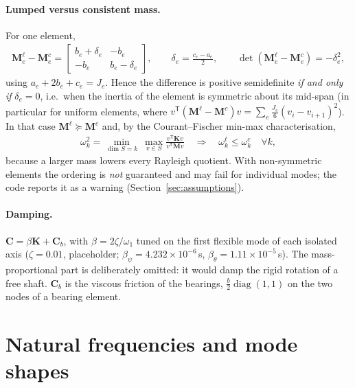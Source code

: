 \documentclass[10pt,a4paper]{article}
\numberwithin{equation}{section}
\begin{document}
\paragraph{Lumped versus consistent mass.} For one element,
\begin{gather}
\mathbf M_e^{\ell} - \mathbf M_e^{c} = \begin{bmatrix} b_e + \delta_e & -b_e \\ -b_e & b_e - \delta_e\end{bmatrix}, \qquad \delta_e = \frac{c_e - a_e}{2}, \qquad
\det\left(\mathbf M_e^{\ell} - \mathbf M_e^{c}\right) = -\delta_e^2 ,
\end{gather}
using $a_e + 2b_e + c_e = J_e$. Hence the difference is positive semidefinite \emph{if and only if} $\delta_e = 0$, i.e.\ when the inertia of the element is symmetric about its mid-span (in particular for uniform elements, where $v^{\mathsf T}(\mathbf M^{\ell}-\mathbf M^{c})v = \sum_e \frac{J_e}{6}(v_i - v_{i+1})^2$). In that case $\mathbf M^{\ell}\succeq\mathbf M^{c}$ and, by the Courant--Fischer min-max characterisation,
\begin{gather}
\omega_k^2 = \min_{\dim S = k}\ \max_{v\in S}\frac{v^{\mathsf T}\mathbf K v}{v^{\mathsf T}\mathbf M v}\quad\Longrightarrow\quad \omega_k^{\ell} \le \omega_k^{c}\quad\forall k,
\end{gather}
because a larger mass lowers every Rayleigh quotient. With non-symmetric elements the ordering is \emph{not} guaranteed and may fail for individual modes; the code reports it as a warning (Section~\ref{sec:assumptions}).
\paragraph{Damping.} $\mathbf C = \beta\mathbf K + \mathbf C_b$, with $\beta = 2\zeta/\omega_1$ tuned on the first flexible mode of each isolated axis ($\zeta = 0.01$, placeholder; $\beta_\psi = 4.232\times10^{-6}$\,s, $\beta_\theta = 1.11\times10^{-5}$\,s). The mass-proportional part is deliberately omitted: it would damp the rigid rotation of a free shaft. $\mathbf C_b$ is the viscous friction of the bearings, $\frac{b}{2}\operatorname{diag}(1,1)$ on the two nodes of a bearing element.
\section{Natural frequencies and mode shapes}\label{sec:eigen}
\end{document}
